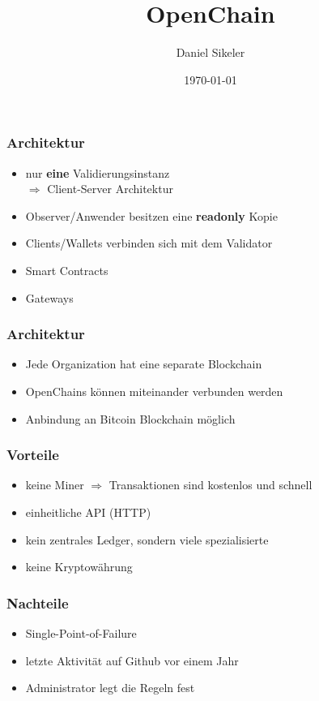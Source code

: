 \documentclass[17pt]{beamer}
\title{OpenChain}
\author{Daniel Sikeler}
\date{\today}
\begin{document}
\maketitle

\begin{frame}
\frametitle{Architektur}
\begin{itemize}
	\item nur \textbf{eine} Validierungsinstanz \\ $\Rightarrow$ Client-Server Architektur
	\item Observer/Anwender besitzen eine \textbf{readonly} Kopie
	\item Clients/Wallets verbinden sich mit dem Validator
	\item Smart Contracts
	\item Gateways
\end{itemize}
\end{frame}

\begin{frame}
\frametitle{Architektur}
\begin{itemize}
	\item Jede Organization hat eine separate Blockchain
	\item OpenChains können miteinander verbunden werden
	\item Anbindung an Bitcoin Blockchain möglich
\end{itemize}
\end{frame}

\begin{frame}
\frametitle{Vorteile}
\begin{itemize}
	\item keine Miner $\Rightarrow$ Transaktionen sind kostenlos und schnell
	\item einheitliche API (HTTP)
	\item kein zentrales Ledger, sondern viele spezialisierte
	\item keine Kryptowährung
\end{itemize}
\end{frame}

\begin{frame}
\frametitle{Nachteile}
\begin{itemize}
	\item Single-Point-of-Failure
	\item letzte Aktivität auf Github vor einem Jahr
	\item Administrator legt die Regeln fest
\end{itemize}
\end{frame}
\end{document}
